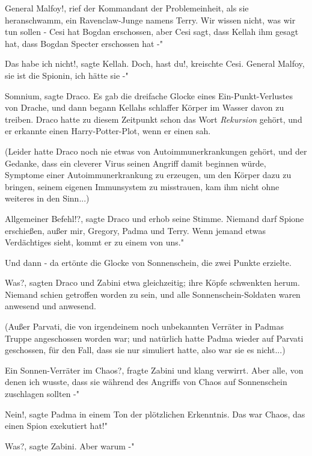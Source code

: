 \glqq General Malfoy!\grqq{}, rief der Kommandant der Problemeinheit, als sie
heranschwamm, ein Ravenclaw-Junge namens Terry. \glqq Wir wissen nicht, was wir
tun sollen - Cesi hat Bogdan erschossen, aber Cesi sagt, dass Kellah ihm gesagt
hat, dass Bogdan Specter erschossen hat -"

\glqq Das habe ich nicht!\grqq{}, sagte Kellah. \glqq Doch, hast du!\grqq{},
kreischte Cesi. \glqq General Malfoy, sie ist die Spionin, ich hätte sie -"

\glqq Somnium\grqq{}, sagte Draco. Es gab die dreifache Glocke eines
Ein-Punkt-Verlustes von Drache, und dann begann Kellahs schlaffer Körper im
Wasser davon zu treiben. Draco hatte zu diesem Zeitpunkt schon das Wort \glqq
\emph{Rekursion}\grqq{} gehört, und er erkannte einen Harry-Potter-Plot, wenn er
einen sah.

(Leider hatte Draco noch nie etwas von Autoimmunerkrankungen gehört, und der
Gedanke, dass ein cleverer Virus seinen Angriff damit beginnen würde, Symptome
einer Autoimmunerkrankung zu erzeugen, um den Körper dazu zu bringen, seinem
eigenen Immunsystem zu misstrauen, kam ihm nicht ohne weiteres in den Sinn...)

\glqq Allgemeiner Befehl!?\grqq{}, sagte Draco und erhob seine Stimme. \glqq
Niemand darf Spione erschießen, außer mir, Gregory, Padma und Terry. Wenn jemand
etwas Verdächtiges sieht, kommt er zu einem von uns."

Und dann - da ertönte die Glocke von Sonnenschein, die zwei Punkte erzielte.

\glqq Was?\grqq{}, sagten Draco und Zabini etwa gleichzeitig; ihre Köpfe
schwenkten herum. Niemand schien getroffen worden zu sein, und alle
Sonnenschein-Soldaten waren anwesend und anwesend.

(Außer Parvati, die von irgendeinem noch unbekannten Verräter in Padmas Truppe
angeschossen worden war; und natürlich hatte Padma wieder auf Parvati
geschossen, für den Fall, dass sie nur simuliert hatte, also war sie es
nicht...)

\glqq Ein Sonnen-Verräter im Chaos?\grqq{}, fragte Zabini und klang verwirrt.
\glqq Aber alle, von denen ich wusste, dass sie während des Angriffs von Chaos
auf Sonnenschein zuschlagen sollten -"

\glqq Nein!\grqq{}, sagte Padma in einem Ton der plötzlichen Erkenntnis. \glqq
Das war Chaos, das einen Spion exekutiert hat!"

\glqq Was?\grqq{}, sagte Zabini. \glqq Aber warum -"

